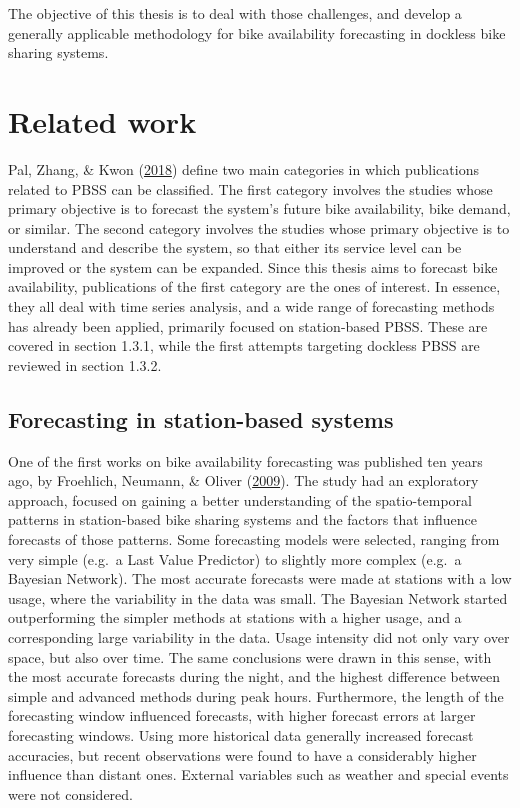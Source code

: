 \documentclass[12pt,oneside]{reedthesis}
\begin{document}
The objective of this thesis is to deal with those challenges, and
develop a generally applicable methodology for bike availability
forecasting in dockless bike sharing systems.

\section{Related work}\label{related-work}

Pal, Zhang, \& Kwon (\protect\hyperlink{ref-pal2018}{2018}) define two
main categories in which publications related to PBSS can be classified.
The first category involves the studies whose primary objective is to
forecast the system's future bike availability, bike demand, or similar.
The second category involves the studies whose primary objective is to
understand and describe the system, so that either its service level can
be improved or the system can be expanded. Since this thesis aims to
forecast bike availability, publications of the first category are the
ones of interest. In essence, they all deal with time series analysis,
and a wide range of forecasting methods has already been applied,
primarily focused on station-based PBSS. These are covered in section
1.3.1, while the first attempts targeting dockless PBSS are reviewed in
section 1.3.2.

\subsection{Forecasting in station-based
systems}\label{forecasting-in-station-based-systems}

One of the first works on bike availability forecasting was published
ten years ago, by Froehlich, Neumann, \& Oliver
(\protect\hyperlink{ref-froehlich2009}{2009}). The study had an
exploratory approach, focused on gaining a better understanding of the
spatio-temporal patterns in station-based bike sharing systems and the
factors that influence forecasts of those patterns. Some forecasting
models were selected, ranging from very simple (e.g.~a Last Value
Predictor) to slightly more complex (e.g.~a Bayesian Network). The most
accurate forecasts were made at stations with a low usage, where the
variability in the data was small. The Bayesian Network started
outperforming the simpler methods at stations with a higher usage, and a
corresponding large variability in the data. Usage intensity did not
only vary over space, but also over time. The same conclusions were
drawn in this sense, with the most accurate forecasts during the night,
and the highest difference between simple and advanced methods during
peak hours. Furthermore, the length of the forecasting window influenced
forecasts, with higher forecast errors at larger forecasting windows.
Using more historical data generally increased forecast accuracies, but
recent observations were found to have a considerably higher influence
than distant ones. External variables such as weather and special events
were not considered.
\end{document}
